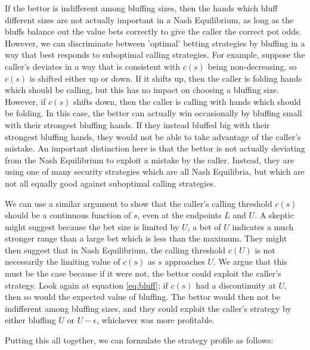 \documentclass[a4paper,12pt]{article}
\theoremstyle{plain}
\theoremstyle{definition}
\begin{document}
If the bettor is indifferent among bluffing sizes, then the hands which bluff different sizes are not actually important in a Nash Equilibrium, as long as the bluffs balance out the value bets correctly to give the caller the correct pot odds. However, we can discriminate between 'optimal' betting strategies by bluffing in a way that best responds to suboptimal calling strategies. For example, suppose the caller's deviates in a way that is consistent with $c(s)$ being non-decreasing, so $c(s)$ is shifted either up or down. If it shifts up, then the caller is folding hands which should be calling, but this has no impact on choosing a bluffing size. However, if $c(s)$ shifts down, then the caller is calling with hands which should be folding. In this case, the better can actually win occasionally by bluffing small with their strongest bluffing hands. If they instead bluffed big with their strongest bluffing hands, they would not be able to take advantage of the caller's mistake. An important distinction here is that the bettor is not actually deviating from the Nash Equilibrium to exploit a mistake by the caller. Instead, they are using one of many security strategies which are all Nash Equilibria, but which are not all equally good against suboptimal calling strategies. 

We can use a similar argument to show that the caller's calling threshold $c(s)$ should be a continuous function of $s$, even at the endpoints $L$ and $U$. A skeptic might suggest because the bet size is limited by $U$, a bet of $U$ indicates a much stronger range than a large bet which is less than the maximum. They might then suggest that in Nash Equilibrium, the calling threshold $c(U)$ is not necessarily the limiting value of $c(s)$ as $s$ approaches $U$. We argue that this must be the case because if it were not, the bettor could exploit the caller's strategy. Look again at equation \ref{eq:bluff}; if $c(s)$ had a discontinuity at $U$, then so would the expected value of bluffing. The bettor would then not be indifferent among bluffing sizes, and they could exploit the caller's strategy by either bluffing $U$ or $U-\epsilon$, whichever was more profitable.

Putting this all together, we can formulate the strategy profile as follows:
\end{document}
